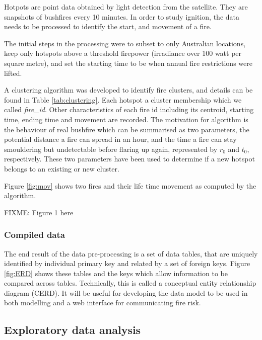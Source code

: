 \documentclass[11pt,a4paper,]{article}
\begin{document}
Hotpots are point data obtained by light detection from the satellite. They are snapshots of bushfires every 10 minutes. In order to study ignition, the data needs to be processed to identify the start, and movement of a fire.

The initial steps in the processing were to subset to only Australian locations, keep only hotspots above a threshold firepower (irradiance over 100 watt per square metre), and set the starting time to be when annual fire restrictions were lifted.

A clustering algorithm was developed to identify fire clusters, and details can be found in Table \ref{tab:clustering}. Each hotspot a cluster membership which we called \emph{fire\_id}. Other characteristics of each fire id including its centroid, starting time, ending time and movement are recorded. The motivation for algorithm is the behaviour of real bushfire which can be summarised as two parameters, the potential distance a fire can spread in an hour, and the time a fire can stay smouldering but undetectable before flaring up again, represented by \(r_0\) and \(t_0\), respectively. These two parameters have been used to determine if a new hotspot belongs to an existing or new cluster.

Figure \ref{fig:mov} shows two fires and their life time movement as computed by the algorithm.

FIXME: Figure 1 here

\hypertarget{compiled-data}{%
\subsubsection{Compiled data}\label{compiled-data}}

The end result of the data pre-processing is a set of data tables, that are uniquely identified by individual primary key and related by a set of foreign keys. Figure \ref{fig:ERD} shows these tables and the keys which allow information to be compared across tables. Technically, this is called a conceptual entity relationship diagram (CERD). It will be useful for developing the data model to be used in both modelling and a web interface for communicating fire risk.

\hypertarget{exploratory-data-analysis}{%
\subsection{Exploratory data analysis}\label{exploratory-data-analysis}}
\end{document}
